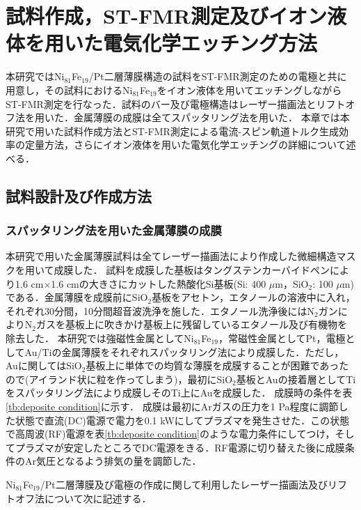 
\chapter{試料作成，ST-FMR測定及びイオン液体を用いた電気化学エッチング方法}\label{chap:making}
本研究ではNi$_{81}$Fe$_{19}$/Pt二層薄膜構造の試料をST-FMR測定のための電極と共に用意し，その試料におけるNi$_{81}$Fe$_{19}$をイオン液体を用いてエッチングしながらST-FMR測定を行なった．試料のバー及び電極構造はレーザー描画法とリフトオフ法を用いた．金属薄膜の成膜は全てスパッタリング法を用いた．
本章では本研究で用いた試料作成方法とST-FMR測定による電流-スピン軌道トルク生成効率の定量方法，さらにイオン液体を用いた電気化学エッチングの詳細について述べる．

\section{試料設計及び作成方法}
\subsection{スパッタリング法を用いた金属薄膜の成膜}
本研究で用いた金属薄膜試料は全てレーザー描画法により作成した微細構造マスクを用いて成膜した．
試料を成膜した基板はタングステンカーバイドペンにより1.6 cm$\times$1.6 cmの大きさにカットした熱酸化Si基板(Si: 400 $\mu$m，SiO$_2$: 100 $\mu$m)である．金属薄膜を成膜前にSiO$_2$基板をアセトン，エタノールの溶液中に入れ，それぞれ30分間，10分間超音波洗浄を施した．エタノール洗浄後にはN$_2$ガンによりN$_2$ガスを基板上に吹きかけ基板上に残留しているエタノール及び有機物を除去した．
本研究では強磁性金属としてNi$_{81}$Fe$_{19}$，常磁性金属としてPt，電極としてAu/Tiの金属薄膜をそれぞれスパッタリング法により成膜した．ただし，Auに関してはSiO$_2$基板上に単体での均質な薄膜を成膜することが困難であったので(アイランド状に粒を作ってしまう)，最初にSiO$_2$基板とAuの接着層としてTiをスパッタリング法により成膜しそのTi上にAuを成膜した．
成膜時の条件を表\ref{tb:deposite condition}に示す．
成膜は最初にArガスの圧力を1 Pa程度に調節した状態で直流(DC)電源で電力を0.1 kWにしてプラズマを発生させた．この状態で高周波(RF)電源を表\ref{tb:deposite condition}のような電力条件にしてつけ，そしてプラズマが安定したところでDC電源をきる．RF電源に切り替えた後に成膜条件のAr気圧となるよう排気の量を調節した．

Ni$_{81}$Fe$_{19}$/Pt二層薄膜及び電極の作成に関して利用したレーザー描画法及びリフトオフ法について次に記述する．

